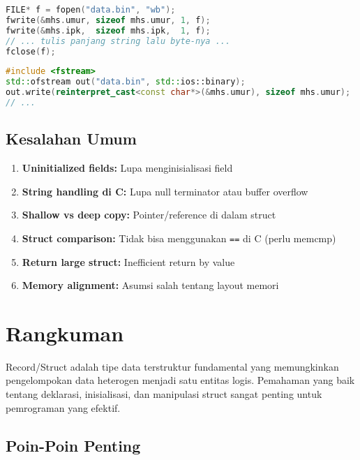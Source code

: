 \documentclass[../main.tex]{subfiles}
\begin{document}
\begin{lstlisting}[language=C, caption={Tulis baca biner per-field (C)}]
FILE* f = fopen("data.bin", "wb");
fwrite(&mhs.umur, sizeof mhs.umur, 1, f);
fwrite(&mhs.ipk,  sizeof mhs.ipk,  1, f);
// ... tulis panjang string lalu byte-nya ...
fclose(f);
\end{lstlisting}

\begin{lstlisting}[language=C++, caption={Mode biner di C++}]
#include <fstream>
std::ofstream out("data.bin", std::ios::binary);
out.write(reinterpret_cast<const char*>(&mhs.umur), sizeof mhs.umur);
// ...
\end{lstlisting}

\subsection{Kesalahan Umum}

\begin{enumerate}
  \item \textbf{Uninitialized fields:} Lupa menginisialisasi field
  \item \textbf{String handling di C:} Lupa null terminator atau buffer overflow
  \item \textbf{Shallow vs deep copy:} Pointer/reference di dalam struct
  \item \textbf{Struct comparison:} Tidak bisa menggunakan \texttt{==} di C (perlu memcmp)
  \item \textbf{Return large struct:} Inefficient return by value
  \item \textbf{Memory alignment:} Asumsi salah tentang layout memori
\end{enumerate}

\section{Rangkuman}

Record/Struct adalah tipe data terstruktur fundamental yang memungkinkan pengelompokan data heterogen menjadi satu entitas logis. Pemahaman yang baik tentang deklarasi, inisialisasi, dan manipulasi struct sangat penting untuk pemrograman yang efektif.

\subsection{Poin-Poin Penting}
\end{document}
